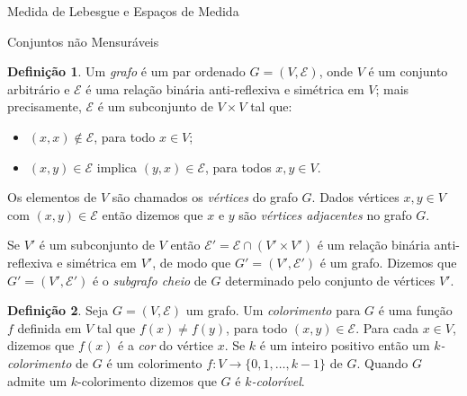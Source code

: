 \documentclass[oneside,final,11pt]{amsbook}
\theoremstyle{remark}\newtheorem{exercise}{Exercício}[chapter]
\theoremstyle{remark}\newtheorem{*exercise}[exercise]{\hbox to 0pt{\hskip 0pt minus 1fil*}Exercício}
\theoremstyle{definition}\newtheorem{exdefin}{Definição}[chapter]
\theoremstyle{plain}\newtheorem{teo}{Teorema}[section]
\theoremstyle{plain}\newtheorem{lem}[teo]{Lema}
\theoremstyle{plain}\newtheorem{prop}[teo]{Proposição}
\theoremstyle{plain}\newtheorem{cor}[teo]{Corolário}
\theoremstyle{definition}\newtheorem{defin}[teo]{Definição}
\theoremstyle{remark}\newtheorem{rem}[teo]{Observação}
\theoremstyle{definition}\newtheorem{notation}[teo]{Notação}
\theoremstyle{definition}\newtheorem{convention}[teo]{Convenção}
\theoremstyle{definition}\newtheorem{example}[teo]{Exemplo}
\numberwithin{section}{chapter}
\numberwithin{equation}{section}
\begin{document}
\begin{chapter}{Medida de Lebesgue e Espaços de Medida}
\begin{section}{Conjuntos não Mensuráveis}
\begin{defin}
Um {\em grafo\/} é um par ordenado $G=(V,\mathcal E)$, onde $V$ é um conjunto
arbitrário e $\mathcal E$ é uma relação binária anti-reflexiva
e simétrica em $V$;
mais precisamente, $\mathcal E$ é um subconjunto de $V\times V$ tal que:
\begin{itemize}
\item $(x,x)\not\in\mathcal E$, para todo $x\in V$;
\item $(x,y)\in\mathcal E$ implica $(y,x)\in\mathcal E$, para todos $x,y\in V$.
\end{itemize}
Os elementos de $V$ são chamados os {\em vértices\/}
do grafo $G$. Dados vértices $x,y\in V$
com $(x,y)\in\mathcal E$ então dizemos que $x$ e $y$ são {\em vértices adjacentes\/}
no grafo $G$.
\end{defin}
Se $V'$ é um subconjunto de $V$ então $\mathcal E'=\mathcal E\cap(V'\times V')$
é um relação binária anti-reflexiva e simétrica em $V'$, de modo que $G'=(V',\mathcal E')$ é um grafo.
Dizemos que $G'=(V',\mathcal E')$ é o {\em subgrafo cheio\/} de $G$ determinado pelo
conjunto de vértices $V'$.

\begin{defin}
Seja $G=(V,\mathcal E)$ um grafo. Um {\em colorimento\/}
para $G$ é uma função $f$ definida em
$V$ tal que $f(x)\ne f(y)$, para todo $(x,y)\in\mathcal E$. Para cada $x\in V$, dizemos que
$f(x)$ é a {\em cor\/} do vértice $x$. Se $k$ é um inteiro positivo então um {\em $k$-colorimento\/}
de $G$ é um colorimento $f:V\to\{0,1,\ldots,k-1\}$ de $G$. Quando $G$ admite um $k$-colorimento
dizemos que $G$ é {\em $k$-colorível}.
\end{defin}


\end{section}
\end{chapter}
\end{document}
